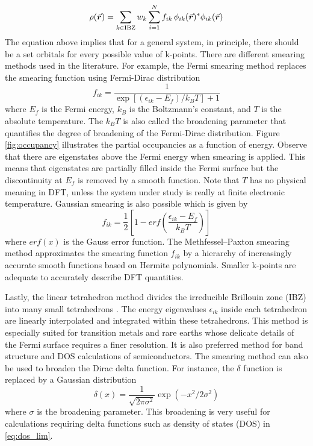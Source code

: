 \begin{equation} \label{eq:rho_general}
	\rho({\va*{r}}) = \sum_{k \in \text{IBZ}} w_k \sum_{i=1}^N f_{ik}\, \phi_{ik}(\va*{r})^* \phi_{ik}(\va*{r})
\end{equation}
The equation above implies that for a  general system, in principle, there should be a  set orbitals for every possible value of k-points. There are different smearing methods used in the literature. For example, the Fermi smearing method replaces the smearing function using Fermi-Dirac distribution \citep{Dirac1926,Fermi1926}
\begin{equation}
	f_{ik} = \frac{1}{\exp[(\epsilon_{ik} - E_f)/k_B T] + 1}
\end{equation}
where $E_f$ is the Fermi energy, $k_B$ is the Boltzmann's constant, and $T$ is the absolute temperature. The $k_B T$ is also called the broadening parameter that quantifies the degree of broadening of the Fermi-Dirac distribution. Figure \ref{fig:occupancy} illustrates the partial occupancies as a function of energy. Observe that there are eigenstates above the Fermi energy when smearing is applied. This means that eigenstates are partially filled inside the Fermi surface but the discontinuity at $E_f$ is removed by a smooth function. Note that $T$ has no physical meaning in DFT, unless the  system under study is really at finite electronic temperature. Gaussian smearing is also possible which is given by \citep{Fu1983}
\begin{equation}
	f_{ik} = \frac{1}{2} \left[1-erf\left(\frac{\epsilon_{ik} - E_f}{k_B T} \right)\right]
\end{equation}
where $erf(x)$ is the Gauss error function. The Methfessel–Paxton smearing method \citep{Methfessel1989}  approximates  the smearing function $f_{ik}$ by a hierarchy of increasingly accurate smooth functions based on Hermite polynomials. Smaller k-points are adequate to accurately describe DFT quantities.

Lastly, the linear tetrahedron method divides the irreducible Brillouin zone (IBZ) into many small tetrahedrons \citep{Bloechl1994a}. The energy eigenvalues $\epsilon_{ik}$ inside each tetrahedron are  linearly
interpolated and integrated within these tetrahedrons. This method is especially suited for  transition metals and rare earths whose delicate details of the Fermi surface requires a finer resolution. It  is also preferred method for band structure and DOS calculations of semiconductors. The smearing method can also be used to broaden the Dirac delta function. For instance, the $\delta$ function is replaced by a Gaussian distribution
\begin{equation}
	\delta(x) = \frac{1}{\sqrt{2 \pi \sigma^2}} \exp(-x^2/2\sigma^2)
\end{equation}
where $\sigma$ is the broadening parameter. This broadening  is very useful for calculations requiring delta functions such as density of states (DOS) in \eqref{eq:dos_lim}.

